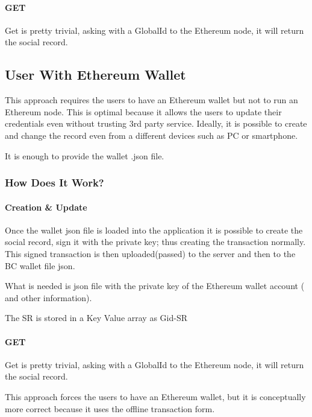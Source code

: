 \paragraph{GET}

Get is pretty trivial, asking with a GlobalId to the Ethereum node, it will return the social record.

\subsection{User With Ethereum Wallet}

This approach requires the users to have an Ethereum wallet but not to run an Ethereum node.
This is optimal because it allows the users to update their credentials even without trusting 3rd party service. Ideally, it is possible to create and change the record even from a different devices such as PC or smartphone.

It is enough to provide the wallet .json file.

\subsubsection{How Does It Work?}
\paragraph{Creation \& Update}

Once the wallet json file is loaded into the application it is possible to create the social record, sign it with the private key; thus creating the transaction normally. This signed transaction is then uploaded(passed) to the server and then to the BC wallet file json.

What is needed is json file with the private key of the Ethereum wallet account ( and other information).

The SR is stored in a Key Value array as Gid-SR

\paragraph{GET}

Get is pretty trivial, asking with a GlobalId to the Ethereum node, it will return the social record.

This approach forces the users to have an Ethereum wallet, but it is conceptually more correct because it uses the offline transaction form.
